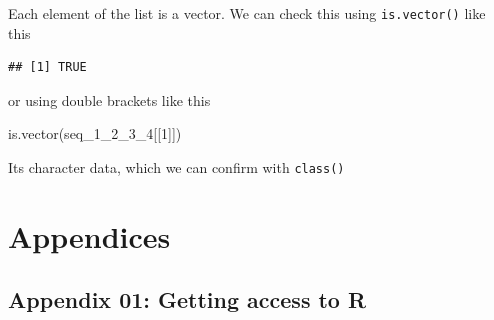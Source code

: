 \documentclass[
]{book}
\newenvironment{Shaded}{\begin{snugshade}}{\end{snugshade}}
\newcommand{\CommentTok}[1]{\textcolor[rgb]{0.56,0.35,0.01}{\textit{#1}}}
\newcommand{\DecValTok}[1]{\textcolor[rgb]{0.00,0.00,0.81}{#1}}
\newcommand{\FunctionTok}[1]{\textcolor[rgb]{0.00,0.00,0.00}{#1}}
\newcommand{\NormalTok}[1]{#1}
\newcommand{\SpecialCharTok}[1]{\textcolor[rgb]{0.00,0.00,0.00}{#1}}
\begin{document}
Each element of the list is a vector. We can check this using \texttt{is.vector()} like this

\begin{Shaded}
\end{Shaded}

\begin{verbatim}
## [1] TRUE
\end{verbatim}

or using double brackets like this

\begin{Shaded}
\begin{Highlighting}[]
\FunctionTok{is.vector}\NormalTok{(seq\_1\_2\_3\_4[[}\DecValTok{1}\NormalTok{]])}
\end{Highlighting}
\end{Shaded}

Its character data, which we can confirm with \texttt{class()}

\begin{Shaded}
\end{Shaded}

\hypertarget{part-appendices}{%
\part{Appendices}\label{part-appendices}}

\hypertarget{section}{%
\subsection*{}\label{section}}

\hypertarget{appendix-01-getting-access-to-r}{%
\chapter*{Appendix 01: Getting access to R}\label{appendix-01-getting-access-to-r}}
\end{document}

